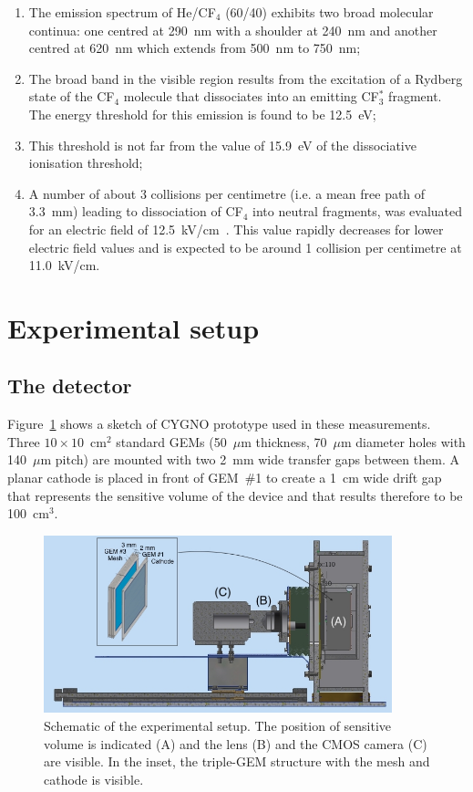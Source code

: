 \documentclass[a4paper,11pt]{article}
\begin{document}
\begin{enumerate}
    \item The emission spectrum of He/CF$_4$ (60/40) exhibits two broad molecular continua: one centred at 290~nm with a shoulder at 240~nm and another centred at 620~nm which extends from 500~nm to 750~nm;
    \item The broad band in the visible region results from the excitation of a Rydberg state of the CF$_4$ molecule that dissociates into an emitting CF$^*_3$ fragment. The energy threshold for this emission is found to be 12.5~eV;
    \item This threshold is not far from the value of 15.9~eV of the dissociative ionisation threshold;
    \item A number of about 3 collisions per centimetre (i.e. a mean free path of 3.3~mm) leading to dissociation of CF$_4$ into neutral fragments, was evaluated for an electric field of 12.5~kV/cm~\cite{bib:Fraga}. This value rapidly decreases for lower electric field values and is expected to be around 1 collision per centimetre at 11.0~kV/cm.
\end{enumerate}



\section{Experimental setup}

\subsection{The detector}

\label{sec:setup}
Figure~\ref{fig:setup} shows a sketch of CYGNO prototype used in these measurements.
Three $10\times10$~cm$^2$ standard GEMs (50~$\mu$m thickness, 70~$\mu$m diameter holes with 140~$\mu$m pitch)
are mounted with two 2~mm wide transfer gaps between them.
A planar cathode is placed in front of GEM~\#1 to create a 1~cm wide drift gap that represents the sensitive volume of the device and that results therefore to be 100~cm$^3$.

\begin{figure}[ht]
\centering
\includegraphics[width=0.9\textwidth]{Mango_layout_cathodo.jpg}
\caption{Schematic of the experimental setup. The position of sensitive volume is indicated (A) and the lens (B) and the CMOS camera (C) are visible.
In the inset, the triple-GEM structure with the mesh and cathode is visible.} 
\label{fig:setup}
\end{figure}
\end{document}
